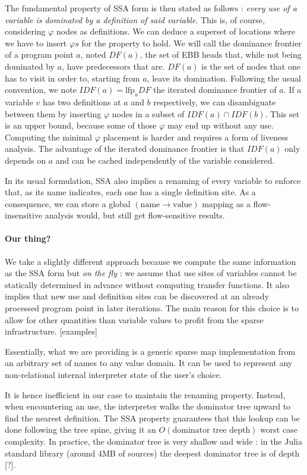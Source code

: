 \documentclass[11pt]{article}
\renewcommand{\phi}{\varphi}
\begin{document}
The fundamental property of SSA form is then stated as follows : \emph{every use of a variable is dominated by a definition of said variable}. This is, of course, considering $\phi$ nodes as definitions. We can deduce a superset of locations where we have to insert $\phi s$ for the property to hold.
We will call the dominance frontier of a program point $a$, noted $DF(a)$, the set of EBB heads that, while not being dominated by $a$, have predecessors that are. $DF(a)$ is the set of nodes that one has to visit in order to, starting from $a$, leave its domination.
Following the usual convention, we note $IDF(a) = \text{lfp}_aDF$ the iterated dominance frontier of $a$.
If a variable $v$ has two definitions at $a$ and $b$ respectively, we can disambiguate between them by inserting $\phi$ nodes in a subset of $IDF(a)\cap IDF(b)$.
This set is an upper bound, because some of those $\phi$ may end up without any use. Computing the minimal $\phi$ placement is harder and requires a form of liveness analysis.
The advantage of the iterated dominance frontier is that $IDF(a)$ only depends on $a$ and can be cached independently of the variable considered.

In its usual formulation, SSA also implies a renaming of every variable to enforce that, as its name indicates, each one has a single definition site. As a consequence, we can store a global $(\text{name}\to\text{value})$ mapping as a flow-insensitive analysis would, but still get flow-sensitive results.


\paragraph{Our thing?} We take a slightly different approach because we compute the same information as the SSA form but \emph{on the fly} : we assume that use sites of variables cannot be statically determined in advance without computing transfer functions.
It also implies that new use and definition sites can be discovered at an already processed program point in later iterations.
The main reason for this choice is to allow for other quantities than variable values to profit from the sparse infrastructure.
[examples]

Essentially, what we are providing is a generic sparse map implementation from an arbitrary set of names to any value domain.
It can be used to represent any non-relational internal interpreter state of the user's choice.

It is hence inefficient in our case to maintain the renaming property. Instead, when encountering an use, the interpreter walks the dominator tree upward to find the nearest definition.
The SSA property guarantees that this lookup can be done following the tree spine, giving it an $O(\text{dominator tree depth})$ worst case complexity. In practice, the dominator tree is very shallow and wide : in the Julia standard library (around 4MB of sources) the deepest dominator tree is of depth [?].
\end{document}
